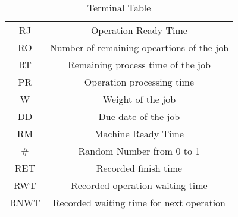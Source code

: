 \begin{table}[H]
    \caption{Terminal Table}
    \centering
    \begin{tabular}{|c|c|}
        \hline
        RJ & Operation Ready Time \\
        RO & Number of remaining opeartions of the job \\
        RT & Remaining process time of the job \\
        PR & Operation processing time \\
        W  & Weight of the job \\
        DD & Due date of the job \\
        RM & Machine Ready Time \\
        \#  & Random Number from 0 to 1 \\
        RET & Recorded finish time \\
        RWT & Recorded operation waiting time \\
        RNWT & Recorded waiting time for next operation \\
        \hline      
    \end{tabular}
    \label{tab:terminal}
\end{table}